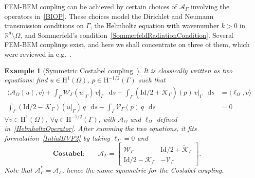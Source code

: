\documentclass[a4paper,11pt]{article}
\newcommand{\RR}{\mathbb{R}}
\newcommand{\mH}{\mathrm{H}}
\newcommand{\Id}{\mathrm{Id}}
\newcommand{\lbr}{\lbrack}
\newcommand{\rbr}{\rbrack}
\newcommand{\diff}{\mathop{}\!\mathrm{d}}   %
\newtheorem{example}[defn]{Example}
\begin{document}
\medskip
FEM-BEM coupling can be achieved by certain choices of
$\mathcal{A}_{\Gamma}$ involving the operators in~\eqref{BIOP}. These
choices model the Dirichlet and Neumann transmission conditions on
$\Gamma$, the Helmholtz equation with wavenumber $k>0$ in
$\RR^d\setminus\Omega$, and Sommerfeld's
condition~\eqref{SommerfeldRadiationCondition}. Several FEM-BEM couplings exist, and here we shall concentrate on
three of them, which were reviewed in e.g.~\cite{MR3038165}.

\begin{example}[Symmetric Costabel coupling~\cite{Costabel1987SMC,MR1052136}]
  It is classically written as two equations: 
  find $u\in \mH^{1}(\Omega)$, $p\in \mH^{-1/2}(\Gamma)$ such that
  \[
    \begin{aligned}
      \langle \mathcal{A}_{\Omega}(u),v\rangle 
      + \int_{\Gamma} \mathcal{W}_{\Gamma}(u\vert_{\Gamma})\,v\vert_{\Gamma} \,\diff s
      + \int_{\Gamma} (\Id/2+\tilde{\mathcal{K}}_{\Gamma})(p)\,v\vert_{\Gamma} \,\diff s  
      & = \langle \ell_{\Omega},v\rangle \\
      \int_{\Gamma} (\Id/2-\mathcal{K}_{\Gamma})(u\vert_{\Gamma})\,q \,\diff s
      - \int_{\Gamma} \mathcal{V}_{\Gamma}(p)\,q \,\diff s & = 0
    \end{aligned}
  \]
  $\forall v\in \mH^{1}(\Omega)$, $\forall q\in \mH^{-1/2}(\Gamma)$,  
  with $\mathcal{A}_{\Omega}$ and $\ell_{\Omega}$ defined in~\eqref{HelmholtzOperator}. 
  After summing the two equations, it fits formulation~\eqref{IntialBVP2} by taking $\ell_{\Gamma}=0$ and 
  \begin{equation}\label{CostabelCoupling}
    \textbf{Costabel:} \qquad
    \mathcal{A}_{\Gamma} =
    \left\lbr\begin{array}{cc}
    \mathcal{W}_{\Gamma} & \Id/2+\tilde{\mathcal{K}}_{\Gamma}\\
    \Id/2-\mathcal{K}_{\Gamma} & -\mathcal{V}_{\Gamma}
    \end{array}\right\rbr.
  \end{equation}
  Note that \(\mathcal{A}_{\Gamma}^* = \mathcal{A}_{\Gamma}\), hence the name \emph{symmetric} for the Costabel coupling.
\end{example}
\end{document}
